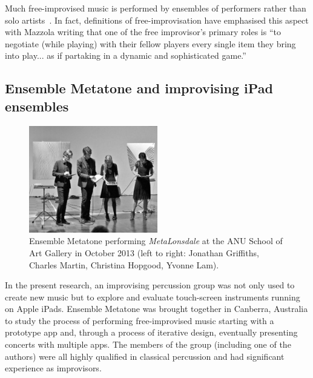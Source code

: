 \documentclass[graybox]{svmult}
\begin{document}
Much free-improvised music is performed by ensembles of performers
rather than solo artists~\cite{Stenstrom:2009xy}. In fact, definitions
of free-improvisation have emphasised this aspect with Mazzola writing
that one of the free improvisor's primary roles is ``to negotiate
(while playing) with their fellow players every single item they bring
into play... as if partaking in a dynamic and sophisticated
game.''~\cite{Mazzola:2009cr} 

\subsection{Ensemble Metatone and improvising iPad ensembles}


\begin{figure}
  \centering
  \includegraphics[width=0.5\textwidth]{figures/ensemblemetatone-bw}
  \caption{Ensemble Metatone performing \emph{MetaLonsdale} at the ANU
    School of Art Gallery in October 2013 (left to right: Jonathan
    Griffiths, Charles Martin, Christina Hopgood, Yvonne Lam).}
  \label{ensemblemetatoneperforming}
\end{figure}



In the present research, an improvising percussion group was not only
used to create new music but to explore and evaluate touch-screen
instruments running on Apple iPads. Ensemble Metatone was brought
together in Canberra, Australia to study the process of performing
free-improvised music starting with a prototype app and, through a
process of iterative design, eventually presenting concerts with
multiple apps. The members of the group (including one of the authors)
were all highly qualified in classical percussion and had significant
experience as improvisors.
\end{document}
